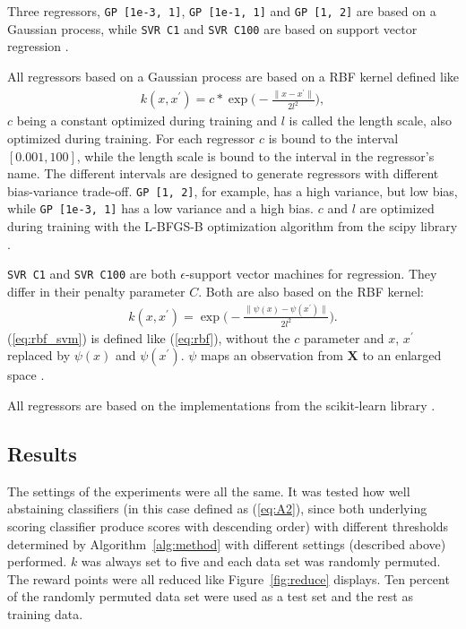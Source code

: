 \documentclass[twoside,11pt]{article}
\def\X{\textbf{X}}
\begin{document}
Three regressors, \texttt{GP [1e-3, 1]},
\texttt{GP [1e-1, 1]} and \texttt{GP [1, 2]} are based on
a Gaussian process, while \texttt{SVR C1} and
\texttt{SVR C100} are based on support vector regression
\citep[see e.g.][Chapters 14, 15]{murphy_2012}.

All regressors based on a Gaussian process are based on
a RBF kernel defined like
\begin{align}
  \label{eq:rbf}
  k(x, x^\prime) = c * \exp \bigg(
    -\frac{\| x - x^\prime \|}{2l^2} \bigg),
\end{align}
$c$ being a constant optimized during training and $l$ is
called the length scale, also optimized during training.
For each regressor $c$ is bound to the interval
$[0.001, 100]$, while the length scale is bound to the
interval in the regressor's name.
The different intervals are designed to generate regressors
with different bias-variance trade-off.
\texttt{GP [1, 2]}, for example, has a high variance, but
low bias, while \texttt{GP [1e-3, 1]} has a low variance
and a high bias.
$c$ and $l$ are optimized during training with the
L-BFGS-B optimization algorithm from the scipy library
\citep[see][]{zhu_et_al_1997, scipy}.

\texttt{SVR C1} and \texttt{SVR C100} are both
$\epsilon$-support vector machines for regression.
They differ in their penalty parameter $C$.
Both are also based on the RBF kernel:
\begin{align}
  \label{eq:rbf_svm}
  k(x, x^\prime) = \exp \bigg(
    -\frac{\| \psi(x) - \psi(x^\prime) \|}{2l^2} \bigg).
\end{align}
(\ref{eq:rbf_svm}) is defined like (\ref{eq:rbf}),
without the $c$ parameter and $x$, $x^\prime$ replaced by
$\psi(x)$ and $\psi(x^\prime)$.
$\psi$ maps an observation from $\X$ to an enlarged space
\citep[see][Chapter 12.3]{hastie_et_al_2009}.

All regressors are based on the implementations from
the scikit-learn library \citep[see][]{sklearn_api}.


\subsection{Results}

The settings of the experiments were all the same.
It was tested how well abstaining classifiers (in this
case defined as (\ref{eq:A2}), since both underlying
scoring classifier produce scores with descending order)
with different thresholds determined by
Algorithm~\ref{alg:method} with different settings
(described above) performed. $k$ was always set to five and
each data set was randomly permuted.
The reward points were all reduced like
Figure~\ref{fig:reduce} displays.
Ten percent of the randomly permuted data set were used as
a test set and the rest as training data.
\end{document}

